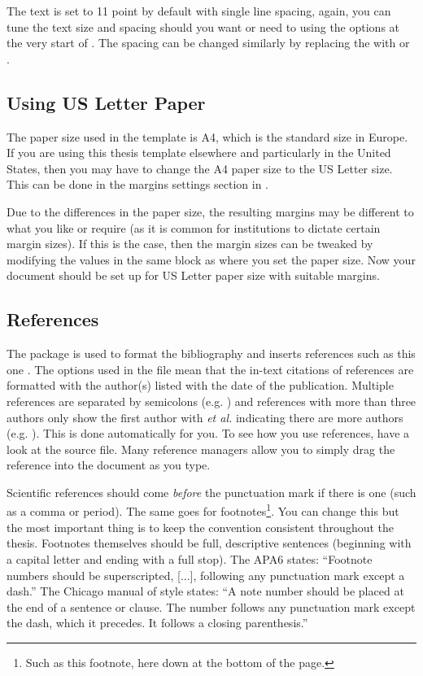The text is set to 11 point by default with single line spacing, again, you can tune the text size and spacing should you want or need to using the options at the very start of . The spacing can be changed similarly by replacing the  with  or .

\subsection{Using US Letter Paper}

The paper size used in the template is A4, which is the standard size in Europe. If you are using this thesis template elsewhere and particularly in the United States, then you may have to change the A4 paper size to the US Letter size. This can be done in the margins settings section in .

Due to the differences in the paper size, the resulting margins may be different to what you like or require (as it is common for institutions to dictate certain margin sizes). If this is the case, then the margin sizes can be tweaked by modifying the values in the same block as where you set the paper size. Now your document should be set up for US Letter paper size with suitable margins.

\subsection{References}

The  package is used to format the bibliography and inserts references such as this one \parencite{Reference4}. The options used in the  file mean that the in-text citations of references are formatted with the author(s) listed with the date of the publication. Multiple references are separated by semicolons (e.g. \parencite{Reference2, Reference1}) and references with more than three authors only show the first author with \emph{et al.} indicating there are more authors (e.g. \parencite{Reference3}). This is done automatically for you. To see how you use references, have a look at the  source file. Many reference managers allow you to simply drag the reference into the document as you type.

Scientific references should come \emph{before} the punctuation mark if there is one (such as a comma or period). The same goes for footnotes\footnote{Such as this footnote, here down at the bottom of the page.}. You can change this but the most important thing is to keep the convention consistent throughout the thesis. Footnotes themselves should be full, descriptive sentences (beginning with a capital letter and ending with a full stop). The APA6 states: \enquote{Footnote numbers should be superscripted, [...], following any punctuation mark except a dash.} The Chicago manual of style states: \enquote{A note number should be placed at the end of a sentence or clause. The number follows any punctuation mark except the dash, which it precedes. It follows a closing parenthesis.}

